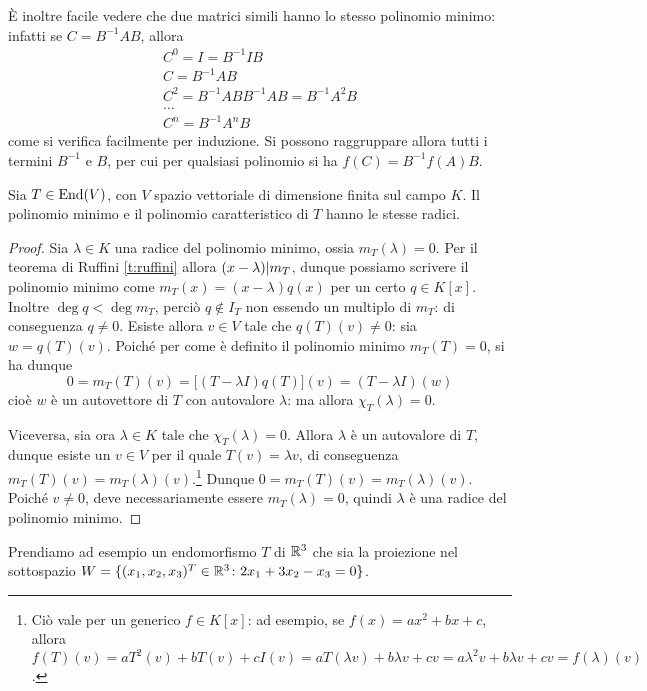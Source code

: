 È inoltre facile vedere che due matrici simili hanno lo stesso polinomio minimo: infatti se $C=B^{-1}AB$, allora
\begin{gather*}
	C^0=I=B^{-1}IB\\
	C=B^{-1}AB\\
	C^2=B^{-1}ABB^{-1}AB=B^{-1}A^2B\\
	\dots\\
	C^n=B^{-1}A^nB
\end{gather*}
come si verifica facilmente per induzione.
Si possono raggruppare allora tutti i termini $B^{-1}$ e $B$, per cui per qualsiasi polinomio si ha $f(C)=B^{-1}f(A)B$.

\begin{teorema} \label{t:radici-polinomio-minimo-caratteristico}
	Sia $T\in \operatorname{End}(V)$, con $V$ spazio vettoriale di dimensione finita sul campo $K$.
	Il polinomio minimo e il polinomio caratteristico di $T$ hanno le stesse radici.
\end{teorema}
\begin{proof}
	Sia $\lambda\in K$ una radice del polinomio minimo, ossia $m_T(\lambda)=0$.
	Per il teorema di Ruffini \ref{t:ruffini} allora $(x-\lambda)| m_T$, dunque possiamo scrivere il polinomio minimo come $m_T(x)=(x-\lambda)q(x)$ per un certo $q\in K[x]$.
	Inoltre $\deg q<\deg m_T$, perciò $q\notin I_T$ non essendo un multiplo di $m_T$: di conseguenza $q\ne 0$.
	Esiste allora $v\in V$ tale che $q(T)(v)\ne 0$: sia $w=q(T)(v)$.
	Poich\'e per come è definito il polinomio minimo $m_T(T)=0$, si ha dunque
	\begin{equation*}
		0=m_T(T)(v)=\big[(T-\lambda I)q(T)\big](v)=(T-\lambda I)(w)
	\end{equation*}
	cioè $w$ è un autovettore di $T$ con autovalore $\lambda$: ma allora $\chi_T(\lambda)=0$.

	Viceversa, sia ora $\lambda\in K$ tale che $\chi_T(\lambda) = 0$.
	Allora $\lambda$ è un autovalore di $T$, dunque esiste un $v\in V$ per il quale	$T(v)=\lambda v$, di conseguenza $m_T(T)(v)=m_T(\lambda)(v)$.\footnote{Ciò vale per un generico $f\in K[x]$: ad esempio, se $f(x)=ax^2+bx+c$, allora $f(T)(v)=aT^2(v)+bT(v)+cI(v)=aT(\lambda v)+b\lambda v+cv=a\lambda^2 v+b\lambda v+cv=f(\lambda)(v)$.}
	Dunque $0=m_T(T)(v)=m_T(\lambda)(v)$.
	Poich\'e $v\ne 0$, deve necessariamente essere $m_T(\lambda)=0$, quindi $\lambda$ è una radice del polinomio minimo.
\end{proof}
Prendiamo ad esempio un endomorfismo $T$ di $\mathbb{R}^3$ che sia la proiezione nel sottospazio $W=\{(x_1,x_2,x_3)^T\in\mathbb{R}^3\colon 2x_1+3x_2-x_3=0\}$.
